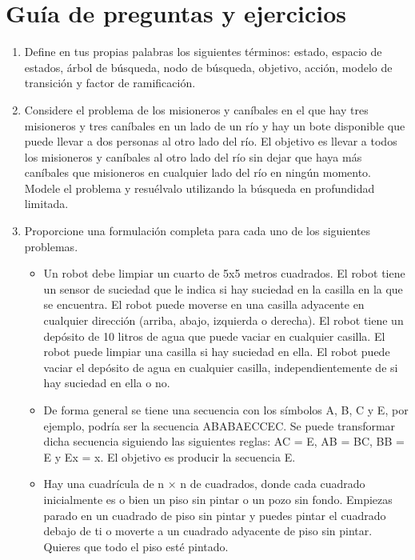 \usepackage[spanish]{babel}


  \thispagestyle{empty}

  \portada %

  \newpage
  \section*{Guía de preguntas y ejercicios}

  \begin{enumerate}
    \item Define en tus propias palabras los siguientes términos: estado, espacio de estados, árbol de búsqueda, nodo de búsqueda, objetivo, acción, modelo de transición y factor de ramificación.
    \item Considere el problema de los misioneros y caníbales en el que hay tres misioneros y tres caníbales en un lado de un río y hay un bote disponible que puede llevar a dos personas al otro lado del río. El objetivo es llevar a todos los misioneros y caníbales al otro lado del río sin dejar que haya más caníbales que misioneros en cualquier lado del río en ningún momento. Modele el problema y resuélvalo utilizando la búsqueda en profundidad limitada.
    \item Proporcione una formulación completa para cada uno de los siguientes problemas.
    \begin{itemize}
      \item Un robot debe limpiar un cuarto de 5x5 metros cuadrados. El robot tiene un sensor de suciedad que le indica si hay suciedad en la casilla en la que se encuentra. El robot puede moverse en una casilla adyacente en cualquier dirección (arriba, abajo, izquierda o derecha). El robot tiene un depósito de 10 litros de agua que puede vaciar en cualquier casilla. El robot puede limpiar una casilla si hay suciedad en ella. El robot puede vaciar el depósito de agua en cualquier
      casilla, independientemente de si hay suciedad en ella o no.
      \item De forma general se tiene una secuencia con los símbolos A, B, C y E, por ejemplo, podría ser la secuencia ABABAECCEC. Se puede transformar dicha secuencia siguiendo las siguientes reglas: AC = E, AB = BC, BB = E y Ex = x. El objetivo es producir la secuencia E.
      \item Hay una cuadrícula de n × n de cuadrados, donde cada cuadrado inicialmente es o bien un piso sin pintar o un pozo sin fondo. Empiezas parado en un cuadrado de piso sin pintar y puedes pintar el cuadrado debajo de ti o moverte a un cuadrado adyacente de piso sin pintar. Quieres que todo el piso esté pintado.

\end{itemize}
\end{enumerate}
